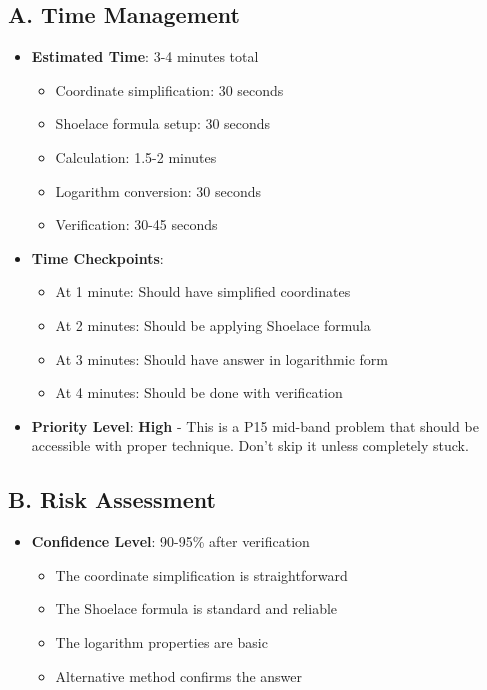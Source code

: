 \documentclass[12pt]{article}
\begin{document}
\begin{competitionbox}
\subsection*{A. Time Management}
\begin{itemize}[leftmargin=*]
    \item \textbf{Estimated Time}: 3-4 minutes total
    \begin{itemize}
        \item Coordinate simplification: 30 seconds
        \item Shoelace formula setup: 30 seconds
        \item Calculation: 1.5-2 minutes
        \item Logarithm conversion: 30 seconds
        \item Verification: 30-45 seconds
    \end{itemize}
    
    \item \textbf{Time Checkpoints}: 
    \begin{itemize}
        \item At 1 minute: Should have simplified coordinates
        \item At 2 minutes: Should be applying Shoelace formula
        \item At 3 minutes: Should have answer in logarithmic form
        \item At 4 minutes: Should be done with verification
    \end{itemize}
    
    \item \textbf{Priority Level}: \textbf{High} - This is a P15 mid-band problem that should be accessible with proper technique. Don't skip it unless completely stuck.
\end{itemize}

\subsection*{B. Risk Assessment}
\begin{itemize}[leftmargin=*]
    \item \textbf{Confidence Level}: 90-95\% after verification
    \begin{itemize}
        \item The coordinate simplification is straightforward
        \item The Shoelace formula is standard and reliable
        \item The logarithm properties are basic
        \item Alternative method confirms the answer
    \end{itemize}
    

\end{itemize}
\end{competitionbox}
\end{document}
